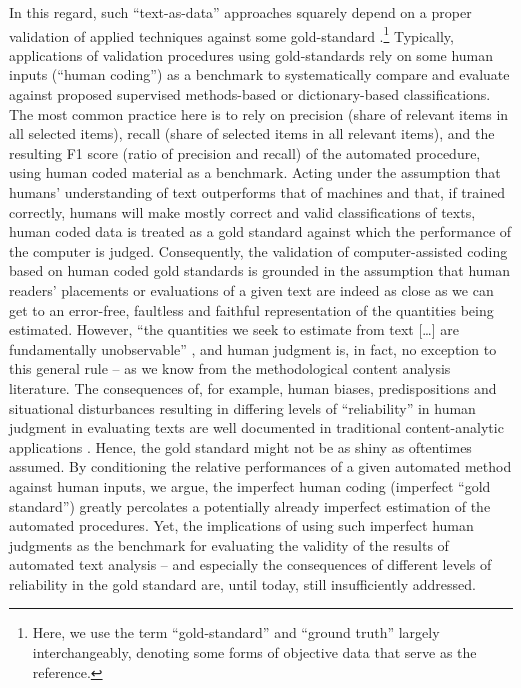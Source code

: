 \documentclass[man, 12pt, a4paper, nolmodern, noextraspace]{apa6}
\begin{document}
    In this regard, such \enquote{text-as-data} approaches squarely depend on a proper validation of applied techniques against some gold-standard \parencite{grimmer2013text}.\footnote{Here, we use the term \enquote{gold-standard} and \enquote{ground truth} largely interchangeably, denoting some forms of objective data that serve as the reference.} Typically, applications of validation procedures using gold-standards rely on some human inputs (\enquote{human coding}) as a  benchmark to systematically compare and evaluate against proposed supervised methods-based or dictionary-based classifications. The most common practice here is to rely on precision (share of relevant items in all selected items), recall (share of selected items in all relevant items), and the resulting F1 score (ratio of precision and recall) of the automated procedure, using human coded material as a benchmark. Acting under the assumption that humans’ understanding of text outperforms that of machines and that, if trained correctly, humans will make mostly correct and valid classifications of texts, human coded data is treated as a gold standard against which the performance of the computer is judged. Consequently, the validation of computer-assisted coding based on human coded gold standards is grounded in the assumption that human readers’ placements or evaluations of a given text are indeed as close as we can get to an error-free, faultless and faithful representation of the quantities being estimated. However, “the quantities we seek to estimate from text [\ldots] are fundamentally unobservable” \parencite[p. 299]{lowe2013validating}, and human judgment is, in fact, no exception to this general rule -- as we know from the methodological content analysis literature. The consequences of, for example, human biases, predispositions and situational disturbances resulting in differing levels of “reliability” in human judgment in evaluating texts are well documented in traditional content-analytic applications \parencite[e.g.,][]{krippendorff2004reliability, hayes2007answering, lombard2002content, ennser2018impact}. Hence, the gold standard might not be as shiny as oftentimes assumed. By conditioning the relative performances of a given automated method against human inputs, we argue, the imperfect human coding (imperfect “gold standard”) greatly percolates a potentially already imperfect estimation of the automated procedures. Yet, the implications of using such imperfect human judgments as the benchmark for evaluating the validity of the results of automated text analysis – and especially the consequences of different levels of reliability in the gold standard are, until today, still insufficiently addressed.
    
\end{document}
